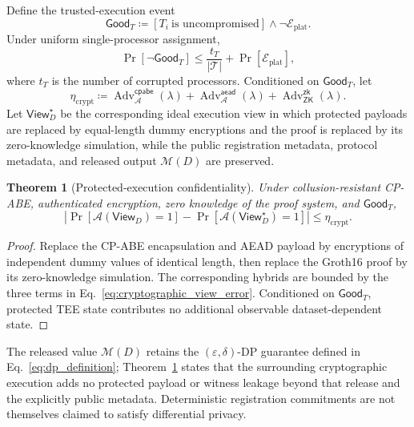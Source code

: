 \documentclass[10pt,journal,compsoc]{IEEEtran}
\newtheorem{theorem}{Theorem}
\begin{document}
Define the trusted-execution event
\begin{equation}
\mathsf{Good}_{T}\coloneqq
[T_i\ \text{is uncompromised}]
\land\neg\mathcal{E}_{\mathrm{plat}}.
\label{eq:good_tee_event}
\end{equation}
Under uniform single-processor assignment,
\begin{equation}
\Pr[\neg\mathsf{Good}_{T}]
\leq
\frac{t_T}{|\mathcal{T}|}
+
\Pr[\mathcal{E}_{\mathrm{plat}}],
\label{eq:tee_trust_failure_probability}
\end{equation}
where $t_T$ is the number of corrupted processors. Conditioned on $\mathsf{Good}_{T}$, let
\begin{equation}
\eta_{\mathrm{crypt}}
\coloneqq
\operatorname{Adv}^{\mathsf{cpabe}}_{\mathcal{A}}(\lambda)
+
\operatorname{Adv}^{\mathsf{aead}}_{\mathcal{A}}(\lambda)
+
\operatorname{Adv}^{\mathsf{zk}}_{\mathsf{ZK}}(\lambda).
\label{eq:cryptographic_view_error}
\end{equation}
Let $\mathsf{View}^{\star}_{D}$ be the corresponding ideal execution view in which protected payloads are replaced by equal-length dummy encryptions and the proof is replaced by its zero-knowledge simulation, while the public registration metadata, protocol metadata, and released output $\mathcal{M}(D)$ are preserved.

\begin{theorem}[Protected-execution confidentiality]
\label{thm:computational_dp_lifting}
Under collusion-resistant CP-ABE, authenticated encryption, zero knowledge of the proof system, and $\mathsf{Good}_{T}$,
\begin{equation}
\left|
\Pr[\mathcal{A}(\mathsf{View}_{D})=1]
-
\Pr[\mathcal{A}(\mathsf{View}^{\star}_{D})=1]
\right|
\leq
\eta_{\mathrm{crypt}}.
\label{eq:lifted_view_privacy_bound}
\end{equation}
\end{theorem}

\begin{proof}
Replace the CP-ABE encapsulation and AEAD payload by encryptions of independent dummy values of identical length, then replace the Groth16 proof by its zero-knowledge simulation. The corresponding hybrids are bounded by the three terms in Eq.~\eqref{eq:cryptographic_view_error}. Conditioned on $\mathsf{Good}_{T}$, protected TEE state contributes no additional observable dataset-dependent state.
\end{proof}

The released value $\mathcal{M}(D)$ retains the $(\varepsilon,\delta)$-DP guarantee defined in Eq.~\eqref{eq:dp_definition}; Theorem~\ref{thm:computational_dp_lifting} states that the surrounding cryptographic execution adds no protected payload or witness leakage beyond that release and the explicitly public metadata. Deterministic registration commitments are not themselves claimed to satisfy differential privacy.
\end{document}
